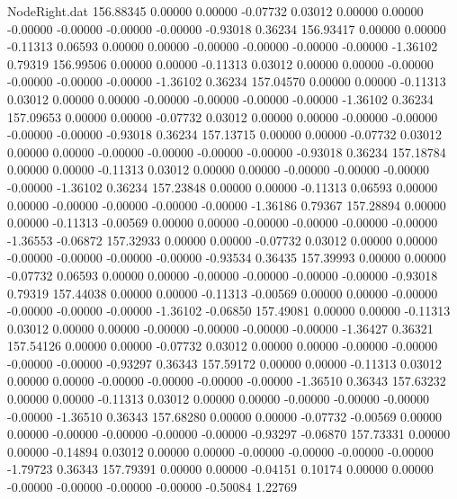 \begin{filecontents}{NodeRight.dat}
 156.88345    0.00000    0.00000    -0.07732    0.03012    0.00000    0.00000   -0.00000   -0.00000   -0.00000   -0.00000   -0.93018    0.36234
 156.93417    0.00000    0.00000    -0.11313    0.06593    0.00000    0.00000   -0.00000   -0.00000   -0.00000   -0.00000   -1.36102    0.79319
 156.99506    0.00000    0.00000    -0.11313    0.03012    0.00000    0.00000   -0.00000   -0.00000   -0.00000   -0.00000   -1.36102    0.36234
 157.04570    0.00000    0.00000    -0.11313    0.03012    0.00000    0.00000   -0.00000   -0.00000   -0.00000   -0.00000   -1.36102    0.36234
 157.09653    0.00000    0.00000    -0.07732    0.03012    0.00000    0.00000   -0.00000   -0.00000   -0.00000   -0.00000   -0.93018    0.36234
 157.13715    0.00000    0.00000    -0.07732    0.03012    0.00000    0.00000   -0.00000   -0.00000   -0.00000   -0.00000   -0.93018    0.36234
 157.18784    0.00000    0.00000    -0.11313    0.03012    0.00000    0.00000   -0.00000   -0.00000   -0.00000   -0.00000   -1.36102    0.36234
 157.23848    0.00000    0.00000    -0.11313    0.06593    0.00000    0.00000   -0.00000   -0.00000   -0.00000   -0.00000   -1.36186    0.79367
 157.28894    0.00000    0.00000    -0.11313   -0.00569    0.00000    0.00000   -0.00000   -0.00000   -0.00000   -0.00000   -1.36553   -0.06872
 157.32933    0.00000    0.00000    -0.07732    0.03012    0.00000    0.00000   -0.00000   -0.00000   -0.00000   -0.00000   -0.93534    0.36435
 157.39993    0.00000    0.00000    -0.07732    0.06593    0.00000    0.00000   -0.00000   -0.00000   -0.00000   -0.00000   -0.93018    0.79319
 157.44038    0.00000    0.00000    -0.11313   -0.00569    0.00000    0.00000   -0.00000   -0.00000   -0.00000   -0.00000   -1.36102   -0.06850
 157.49081    0.00000    0.00000    -0.11313    0.03012    0.00000    0.00000   -0.00000   -0.00000   -0.00000   -0.00000   -1.36427    0.36321
 157.54126    0.00000    0.00000    -0.07732    0.03012    0.00000    0.00000   -0.00000   -0.00000   -0.00000   -0.00000   -0.93297    0.36343
 157.59172    0.00000    0.00000    -0.11313    0.03012    0.00000    0.00000   -0.00000   -0.00000   -0.00000   -0.00000   -1.36510    0.36343
 157.63232    0.00000    0.00000    -0.11313    0.03012    0.00000    0.00000   -0.00000   -0.00000   -0.00000   -0.00000   -1.36510    0.36343
 157.68280    0.00000    0.00000    -0.07732   -0.00569    0.00000    0.00000   -0.00000   -0.00000   -0.00000   -0.00000   -0.93297   -0.06870
 157.73331    0.00000    0.00000    -0.14894    0.03012    0.00000    0.00000   -0.00000   -0.00000   -0.00000   -0.00000   -1.79723    0.36343
 157.79391    0.00000    0.00000    -0.04151    0.10174    0.00000    0.00000   -0.00000   -0.00000   -0.00000   -0.00000   -0.50084    1.22769

\end{filecontents}
